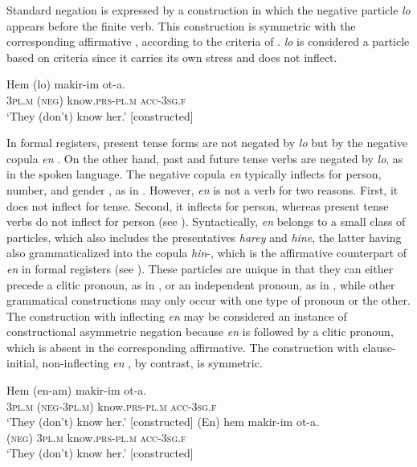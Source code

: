 \documentclass[output=paper,colorlinks,citecolor=brown]{langscibook}
\begin{document}
Standard negation is expressed by a construction in which the negative particle \textit{lo} appears before the finite verb. This construction is symmetric with the corresponding affirmative , according to the criteria of \citet{Miestamo2005}. \textit{lo} is considered a particle based on  criteria since it carries its own stress and does not inflect.

\ea\label{ex:heb:1} 
    \gll Hem (lo) makir-im ot-a. \\ 
          3\textsc{pl.m} (\textsc{neg}) know.\textsc{prs-pl.m} \textsc{acc-3sg.f} \\
    \glt  ‘They (don’t) know her.’ [constructed]
\z

In formal registers, present tense forms are not negated by \textit{lo} but by the negative copula \textit{en} . On the other hand, past and future tense verbs are negated by \textit{lo}, as in the spoken language. The negative copula \textit{en} typically inflects for person, number, and gender \citep[205]{Tzivoni1993}, as in . However, \textit{en} is not a verb for two reasons. First, it does not inflect for tense. Second, it inflects for person, whereas present tense verbs do not inflect for person (see ). Syntactically, \textit{en} belongs to a small class of particles, which also includes the presentatives \textit{harey} and \textit{hine}, the latter having also grammaticalized into the copula \textit{hin}{}-, which is the affirmative counterpart of \textit{en} in formal registers (see ). These particles are unique in that they can either precede a clitic pronoun, as in , or an independent pronoun, as in , while other grammatical constructions may only occur with one type of pronoun or the other. The construction with inflecting \textit{en}  may be considered an instance of constructional asymmetric negation because \textit{en} is followed by a clitic pronoun, which is absent in the corresponding affirmative. The construction with clause-initial, non-inflecting \textit{en} , by contrast, is symmetric.

\ea\label{ex:heb:2} 
    \ea\label{ex:heb:2a}
        \gll Hem (en-am) makir-im ot-a.\\
             3\textsc{pl.m} \textsc{(neg-3pl.m)} know.\textsc{prs-pl.m} \textsc{acc-3sg.f} \\
        \glt ‘They (don’t) know her.' [constructed]
    \ex\label{ex:heb:2b}
        \gll (En) hem makir-im ot-a.\\
             \textsc{(neg)} 3\textsc{pl.m} know.\textsc{prs-pl.m} \textsc{acc-3sg.f} \\
        \glt ‘They (don’t) know her.' [constructed]
    \z 
\z 
\end{document}
